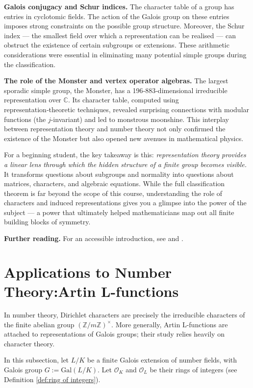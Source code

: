 \noindent \textbf{Galois conjugacy and Schur indices.} 
The character table of a group has entries in cyclotomic fields. The action 
of the Galois group on these entries imposes strong constraints on the 
possible group structure. Moreover, the Schur index — the smallest field 
over which a representation can be realised — can obstruct the existence of 
certain subgroups or extensions. These arithmetic considerations were 
essential in eliminating many potential simple groups during the 
classification.

\medskip

\noindent \textbf{The role of the Monster and vertex operator algebras.} 
The largest sporadic simple group, the Monster, has a 196‑883‑dimensional 
irreducible representation over $\mathbb{C}$. Its character table, computed 
using representation‑theoretic techniques, revealed surprising connections 
with modular functions (the $j$-invariant) and led to monstrous moonshine. 
This interplay between representation theory and number theory not only 
confirmed the existence of the Monster but also opened new avenues in 
mathematical physics.

\medskip

For a beginning student, the key takeaway is this: \emph{representation 
theory provides a linear lens through which the hidden structure of a 
finite group becomes visible.} It transforms questions about subgroups and 
normality into questions about matrices, characters, and algebraic 
equations. While the full classification theorem is far beyond the scope of 
this course, understanding the role of characters and induced 
representations gives you a glimpse into the power of the subject — a power 
that ultimately helped mathematicians map out all finite building blocks of 
symmetry.

\bigskip

\noindent \textbf{Further reading.} For an accessible introduction, see \cite{alperin1995groups} and \cite{aschbacher2004status}.
\section{Applications to Number Theory:Artin L-functions}
In number theory, Dirichlet characters are precisely the irreducible characters of the finite abelian group \((\mathbb{Z}/m\mathbb{Z})^\times\). More generally, Artin L-functions are attached to representations of Galois groups; their study relies heavily on character theory.


In this subsection, let \(L/K\) be a finite Galois extension of number fields, with Galois group \(G := \mathrm{Gal}(L/K)\). Let \(\mathcal{O}_K\) and \(\mathcal{O}_L\) be their rings of integers (see Definition \ref{def:ring of integers}). 

